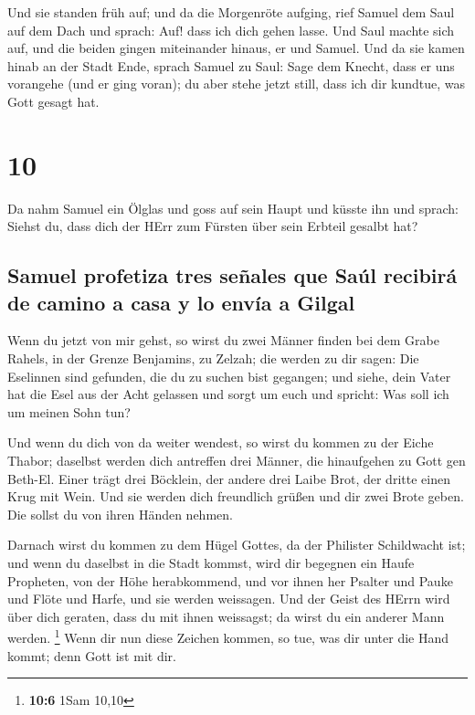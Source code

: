  Und sie standen früh auf; und da die Morgenröte aufging,
rief Samuel dem Saul auf dem Dach und sprach: Auf! dass ich dich gehen
lasse. Und Saul machte sich auf, und die beiden gingen miteinander
hinaus, er und Samuel.  Und da sie kamen hinab an der
Stadt Ende, sprach Samuel zu Saul: Sage dem Knecht, dass er uns
vorangehe (und er ging voran); du aber stehe jetzt still, dass ich dir
kundtue, was Gott gesagt hat.

\hypertarget{section-9}{%
\section{10}\label{section-9}}

 Da nahm Samuel ein Ölglas und goss auf sein Haupt und
küsste ihn und sprach: Siehst du, dass dich der HErr zum Fürsten über
sein Erbteil gesalbt hat?

\hypertarget{samuel-profetiza-tres-seuxf1ales-que-sauxfal-recibiruxe1-de-camino-a-casa-y-lo-envuxeda-a-gilgal}{%
\subsection{Samuel profetiza tres señales que Saúl recibirá de camino a
casa y lo envía a
Gilgal}\label{samuel-profetiza-tres-seuxf1ales-que-sauxfal-recibiruxe1-de-camino-a-casa-y-lo-envuxeda-a-gilgal}}

 Wenn du jetzt von mir gehst, so wirst du zwei Männer
finden bei dem Grabe Rahels, in der Grenze Benjamins, zu Zelzah; die
werden zu dir sagen: Die Eselinnen sind gefunden, die du zu suchen bist
gegangen; und siehe, dein Vater hat die Esel aus der Acht gelassen und
sorgt um euch und spricht: Was soll ich um meinen Sohn tun?

 Und wenn du dich von da weiter wendest, so wirst du
kommen zu der Eiche Thabor; daselbst werden dich antreffen drei Männer,
die hinaufgehen zu Gott gen Beth-El. Einer trägt drei Böcklein, der
andere drei Laibe Brot, der dritte einen Krug mit Wein. 
Und sie werden dich freundlich grüßen und dir zwei Brote geben. Die
sollst du von ihren Händen nehmen.

 Darnach wirst du kommen zu dem Hügel Gottes, da der
Philister Schildwacht ist; und wenn du daselbst in die Stadt kommst,
wird dir begegnen ein Haufe Propheten, von der Höhe herabkommend, und
vor ihnen her Psalter und Pauke und Flöte und Harfe, und sie werden
weissagen.  Und der Geist des HErrn wird über dich
geraten, dass du mit ihnen weissagst; da wirst du ein anderer Mann
werden. \footnote{\textbf{10:6} 1Sam 10,10}  Wenn dir nun
diese Zeichen kommen, so tue, was dir unter die Hand kommt; denn Gott
ist mit dir.

